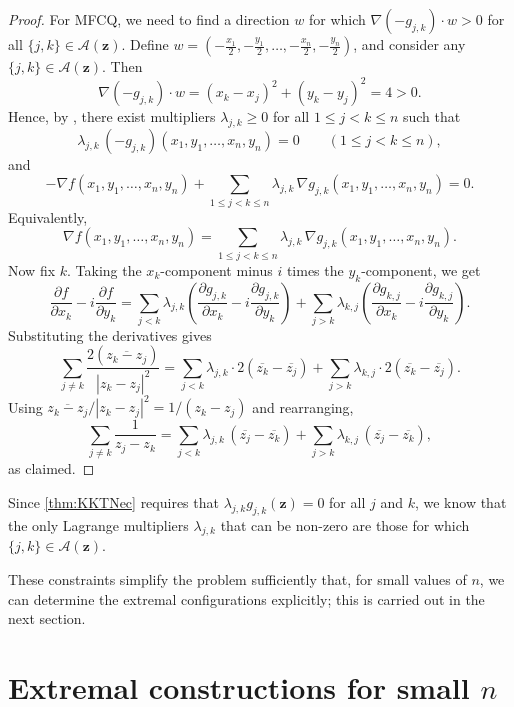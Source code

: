 \documentclass{article}
\theoremstyle{definition}
\let\le\leqslant
\let\ge\geqslant
\begin{document}
\begin{proof}
For MFCQ, we need to find a direction \(w\) for which
\(\nabla (-g_{j,k}) \cdot w > 0\) for all \(\{j,k\}\in \mathcal{A}(\mathbf{z})\).
Define \(w=(-\frac{x_1}2,-\frac{y_1}2,\dots,-\frac{x_n}2,-\frac{y_n}2)\),
and consider any \(\{j,k\}\in \mathcal{A}(\mathbf{z})\). Then
\[
\nabla (-g_{j,k}) \cdot w
= (x_k-x_j)^2+(y_k-y_j)^2=4>0.
\]
Hence, by \cite[Theorem~12.1, Definition~12.6 and around]{nocedal2006numerical},
there exist multipliers \(\lambda_{j,k}\ge 0\) for all \(1\le j<k\le n\) such that
\[
\lambda_{j,k}\,(-g_{j,k})(x_1,y_1,\dots,x_n,y_n)=0\qquad(1\le j<k\le n),
\]
and
\[
-\nabla f(x_1,y_1,\dots,x_n,y_n)
+\sum_{1\le j<k\le n}\lambda_{j,k}\,\nabla g_{j,k}(x_1,y_1,\dots,x_n,y_n)=0.
\]
Equivalently,
\[
\nabla f(x_1,y_1,\dots,x_n,y_n)
=\sum_{1\le j<k\le n}\lambda_{j,k}\,\nabla g_{j,k}(x_1,y_1,\dots,x_n,y_n).
\]
Now fix \(k\). Taking the \(x_k\)-component minus \(i\) times the \(y_k\)-component,
we get
\[
\frac{\partial f}{\partial x_k}- i \frac{\partial f}{\partial y_k}
=
\sum_{j<k}\lambda_{j,k}
\left(\frac{\partial g_{j,k}}{\partial x_k}
-i\frac{\partial g_{j,k}}{\partial y_k}\right)
+
\sum_{j>k}\lambda_{k,j}
\left(\frac{\partial g_{k,j}}{\partial x_k}
-i\frac{\partial g_{k,j}}{\partial y_k}\right).
\]
Substituting the derivatives gives
\[
\sum_{j\neq k}\frac{2(\overline{z_k-z_j})}{|z_k-z_j|^2}
=
\sum_{j<k} \lambda_{j,k}\cdot 2(\overline{z_k}-\overline{z_j})
+
\sum_{j>k} \lambda_{k,j}\cdot 2(\overline{z_k}-\overline{z_j}).
\]
Using \(\overline{z_k-z_j}/|z_k-z_j|^2 = 1/(z_k-z_j)\) and rearranging,
\[
\sum_{j\neq k}\frac{1}{z_j-z_k}
=
\sum_{j<k}\lambda_{j,k}\,(\overline{z_j}-\overline{z_k})
+
\sum_{j>k}\lambda_{k,j}\,(\overline{z_j}-\overline{z_k}),
\]
as claimed.
\end{proof}
Since \cref{thm:KKTNec} requires that \(\lambda_{j,k} g_{j,k}(\mathbf{z})=0\) for all \(j\) and \(k\), we know that the only Lagrange multipliers \(\lambda_{j,k}\) that can be non-zero are those for which \(\{j,k\}\in\mathcal{A}(\mathbf{z})\).





These constraints simplify the problem sufficiently that, for small values of $n$,
we can determine the extremal configurations explicitly; this is carried out in the next section.





\section{Extremal constructions for small $n$}\label{sec:constructionsforsmalln}
\end{document}
